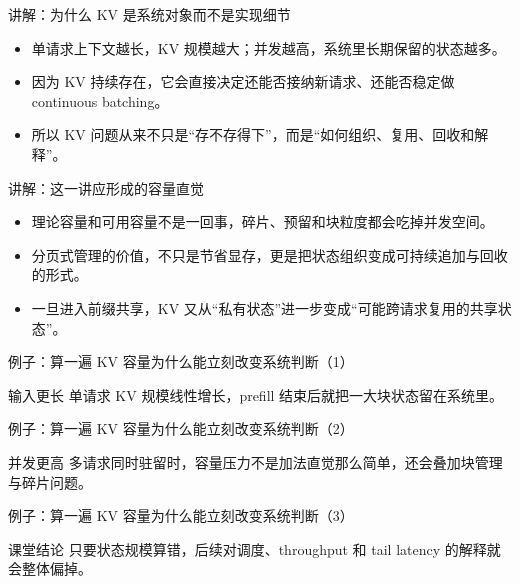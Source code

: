 \begin{frame}{讲解：为什么 KV 是系统对象而不是实现细节}
  \begin{itemize}
    \item 单请求上下文越长，KV 规模越大；并发越高，系统里长期保留的状态越多。
    \item 因为 KV 持续存在，它会直接决定还能否接纳新请求、还能否稳定做 continuous batching。
    \item 所以 KV 问题从来不只是“存不存得下”，而是“如何组织、复用、回收和解释”。
  \end{itemize}
\end{frame}

\begin{frame}{讲解：这一讲应形成的容量直觉}
  \begin{itemize}
    \item 理论容量和可用容量不是一回事，碎片、预留和块粒度都会吃掉并发空间。
    \item 分页式管理的价值，不只是节省显存，更是把状态组织变成可持续追加与回收的形式。
    \item 一旦进入前缀共享，KV 又从“私有状态”进一步变成“可能跨请求复用的共享状态”。
  \end{itemize}
\end{frame}

\begin{frame}{例子：算一遍 KV 容量为什么能立刻改变系统判断（1）}
\begin{block}{输入更长}
    单请求 KV 规模线性增长，prefill 结束后就把一大块状态留在系统里。
  \end{block}
\end{frame}

\begin{frame}{例子：算一遍 KV 容量为什么能立刻改变系统判断（2）}
\begin{block}{并发更高}
    多请求同时驻留时，容量压力不是加法直觉那么简单，还会叠加块管理与碎片问题。
  \end{block}
\end{frame}

\begin{frame}{例子：算一遍 KV 容量为什么能立刻改变系统判断（3）}
\begin{block}{课堂结论}
    只要状态规模算错，后续对调度、throughput 和 tail latency 的解释就会整体偏掉。
  \end{block}
\end{frame}

